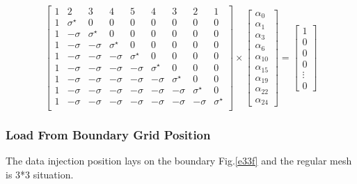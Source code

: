 \begin{equation}
{
\left[ \begin{array}{ccccccccc}
1 & 2 & 3 & 4 & 5 & 4 & 3 & 2 & 1\\
1 & {\sigma}^{\star} & 0 & 0 & 0 & 0 & 0 & 0 & 0\\
1 & -\sigma & {\sigma}^{\star} & 0 & 0 & 0 & 0& 0 & 0 \\
1 & -\sigma & -\sigma & {\sigma}^{\star} & 0 &0 & 0 & 0 & 0 \\
1 & -\sigma & -\sigma & -\sigma & {\sigma}^{\star} & 0 & 0 & 0 & 0\\
1 & -\sigma & -\sigma & -\sigma & -\sigma & {\sigma}^{\star} & 0 & 0 & 0\\
1 & -\sigma & -\sigma & -\sigma & -\sigma & -\sigma & {\sigma}^{\star} & 0 & 0\\
1 & -\sigma & -\sigma & -\sigma & -\sigma & -\sigma & -\sigma & {\sigma}^{\star} &0\\
1 & -\sigma & -\sigma & -\sigma & -\sigma & -\sigma & -\sigma & -\sigma & {\sigma}^{\star}\\
\end{array} 
\right ]} \times \left[ \begin{array}{c}
\alpha_{0} \\
\alpha_{1} \\
\alpha_{3} \\
\alpha_{6} \\
\alpha_{10} \\
\alpha_{15}\\
\alpha_{19}\\
\alpha_{22}\\
\alpha_{24}
\end{array} 
\right ] = \left[ \begin{array}{c}
1 \\
0 \\
0 \\
0 \\
\vdots \\
0
\end{array} 
\right ]
\end{equation}


\vspace*{50pt}
\subsubsection{Load From Boundary Grid Position}
The data injection position lays on the boundary Fig.\ref{e33f} and the regular mesh is 3*3 situation.

